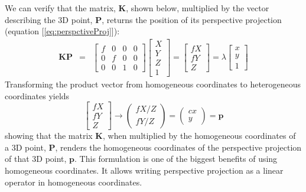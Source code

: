 We can verify that the matrix, $\mathbf{K}$, shown below, multiplied by the vector describing the 3D point, $\mathbf{P}$, returns the position of its perspective projection (equation [\ref{eq:perspctiveProj}]):
\begin{eqnarray}
    \mathbf{K} \mathbf{P} & = &
    \begin{bmatrix}
    f & 0 & 0 & 0 \\
    0 & f & 0 & 0 \\
    0 & 0 & 1 & 0
    \end{bmatrix}
    \begin{bmatrix}
    X \\
    Y \\
    Z \\
    1
    \end{bmatrix}
     = 
    \begin{bmatrix}
    f X \\
    f Y \\
    Z
    \end{bmatrix}
    =
    \lambda
    \begin{bmatrix}
    x \\
    y \\
    1
    \end{bmatrix}
\end{eqnarray}
Transforming the product vector from homogeneous coordinates to heterogeneous coordinates yields
\begin{equation}
    \begin{bmatrix}
    f X \\
    f Y \\
    Z
    \end{bmatrix}
    \rightarrow
    \begin{pmatrix}
    f X/Z \\
    f Y/Z
    \end{pmatrix}
    =
    \begin{pmatrix}{c}
    x \\
    y
    \end{pmatrix}
    =
    \mathbf{p}
\end{equation}
showing that the matrix $\mathbf{K}$, when multiplied by the homogeneous coordinates of a 3D point, $\mathbf{P}$, renders the homogeneous coordinates of the perspective projection of that 3D point, $\mathbf{p}$. This formulation is one of the biggest benefits of using homogeneous coordinates. It allows writing perspective projection as a linear operator in homogeneous coordinates.

